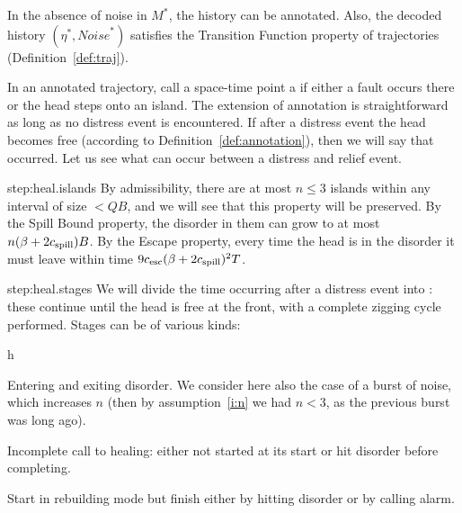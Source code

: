 \documentclass[11pt]{memoir}
\theoremstyle{definition} %
\renewcommand{\le}{\leq}
\def\B{B}
\newcommand{\Noise}{\mathit{Noise}}
\newcommand{\Q}{Q} %
\newcommand{\Tu}{T}
\newcommand{\cns}[1]{c_{\textrm{\upshape #1}}}
\newcommand{\CEsc}{\cns{esc}}
\newcommand{\CSpill}{\cns{spill}}
\begin{document}
  \begin{lemma}[Healing]\label{lem:healing}
In the absence of noise in \( M^{*} \), the history can be annotated.
Also, the decoded history \( (\eta^{*},\Noise^{*}) \) satisfies the Transition Function property 
of trajectories (Definition~\ref{def:traj}).
\end{lemma}
\begin{Proof}
  In an annotated trajectory, call a space-time point a  if either a
  fault occurs there or the head steps onto an island.
The extension of annotation is straightforward as long as no distress event is encountered.
If after a distress event the head becomes free (according to Definition~\ref{def:annotation}),
then we will say that  occurred.
Let us see what can occur between a distress and relief event.

\begin{step+}{step:heal.islands}
  By admissibility, there are at most \( n\le 3 \)
  islands within any interval of size \( <\Q\B \), and we will
  see that this property will be preserved.  
By the Spill Bound property,
the disorder in them can grow to at most \( n(\beta + 2\CSpill)\B \).
By the Escape property, every time the head is in the disorder
it must leave within time \( 9\CEsc(\beta+2\CSpill)^{2}\Tu \).
\end{step+}

\begin{step+}{step:heal.stages}
We will divide the time occurring after a distress event into : these continue until the head
is free at the front, with a complete zigging cycle performed.
Stages can be of various kinds:
\end{step+}
\begin{prooof}

\begin{varenum}{h}
\item\label{i:disorder} Entering and exiting disorder.
  We consider here also the case of a burst of noise, which increases \( n \)
  (then by assumption~\eqref{i:n} we had \( n<3 \), as the previous burst was long ago).

\item\label{i:heal-incomplete}
  Incomplete call to healing: either not started at its start or hit disorder before completing.

\item\label{i:rebuild} Start in rebuilding mode but finish either by hitting disorder or by calling alarm.


\end{varenum}
\end{prooof}
\end{Proof}
\end{document}
